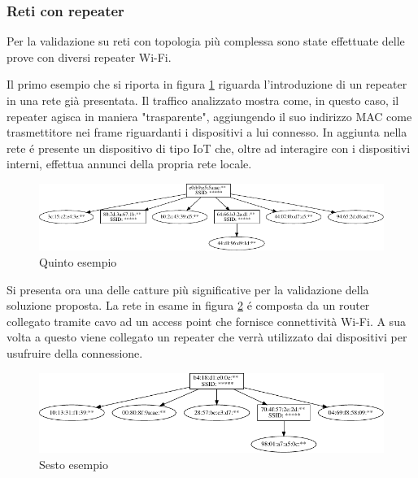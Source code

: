 
\newpage

\subsubsection{Reti con repeater}

Per la validazione su reti con topologia pi\`u complessa sono state effettuate delle prove con diversi repeater Wi-Fi.

Il primo esempio che si riporta in figura \ref{fig:es5} riguarda l'introduzione di un repeater in una rete gi\`a presentata.
Il traffico analizzato mostra come, in questo caso, il repeater agisca in maniera "trasparente", aggiungendo il suo indirizzo MAC come trasmettitore nei frame riguardanti i dispositivi a lui connesso.
In aggiunta nella rete \'e presente un dispositivo di tipo IoT che, oltre ad interagire con i dispositivi interni, effettua annunci della propria rete locale.

\begin{figure}[!h]
	\centering
	\includegraphics{images/img12censored.pdf}
	\caption{Quinto esempio}
	\label{fig:es5}
\end{figure}


Si presenta ora una delle catture pi\`u significative per la validazione della soluzione proposta.
La rete in esame in figura \ref{fig:es6} \'e composta da un router collegato tramite cavo ad un access point che fornisce connettivit\`a Wi-Fi.
A sua volta a questo viene collegato un repeater che verr\`a utilizzato dai dispositivi per usufruire della connessione.

\begin{figure}[!h]
	\centering
	\includegraphics{images/img13censored.pdf}
	\caption{Sesto esempio}
	\label{fig:es6}
\end{figure}

